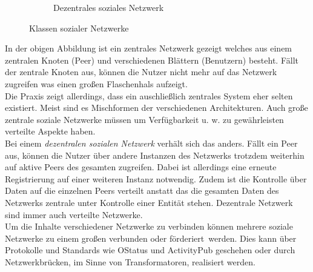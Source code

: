 \begin{figure}[H]
\begin{subfigure}[t]{0.4\linewidth}
			\caption{Dezentrales soziales Netzwerk}
			\label{fig:decentral-network}
		\end{subfigure}
		\vspace{4pt}
		\caption{Klassen sozialer Netzwerke}
	\end{figure}
	In der obigen Abbildung ist ein zentrales Netzwerk gezeigt welches aus einem zentralen Knoten (Peer) und verschiedenen Blättern (Benutzern) besteht. Fällt der zentrale Knoten aus, können die Nutzer nicht mehr auf das Netzwerk zugreifen was einen großen Flaschenhals aufzeigt.~\\
	
	Die Praxis zeigt allerdings, dass ein auschließlich zentrales System eher selten existiert. Meist sind es Mischformen der verschiedenen Architekturen. Auch große zentrale soziale Netzwerke müssen um Verfügbarkeit u. w. zu gewährleisten verteilte Aspekte haben.~\\
	
	Bei einem \textit{dezentralen sozialen Netzwerk} verhält sich das anders. Fällt ein Peer aus, können die Nutzer über andere Instanzen des Netzwerks trotzdem weiterhin auf aktive Peers des gesamten zugreifen. Dabei ist allerdings eine erneute Registrierung auf einer weiteren Instanz notwendig. Zudem ist die Kontrolle über Daten auf die einzelnen Peers verteilt anstatt das die gesamten Daten des Netzwerks zentrale unter Kontrolle einer Entität stehen. Dezentrale Netzwerk sind immer auch verteilte Netzwerke.~\\
	
	Um die Inhalte verschiedener Netzwerke zu verbinden können mehrere soziale Netzwerke zu einem großen verbunden oder \glqq förderiert\grqq~werden. Dies kann über Protokolle und Standards wie OStatus und ActivityPub geschehen oder durch Netzwerkbrücken, im Sinne von Transformatoren, realisiert werden.
